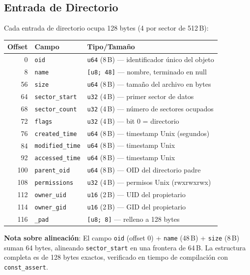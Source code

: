 \documentclass[11pt,twoside,openright]{book}
\theoremstyle{definition}
\theoremstyle{plain}
\theoremstyle{remark}
\begin{document}
\subsection{Entrada de Directorio}

Cada entrada de directorio ocupa 128 bytes (4 por sector de 512\,B):

\begin{center}
\begin{tabular}{@{}rll@{}}
\toprule
\textbf{Offset} & \textbf{Campo} & \textbf{Tipo/Tamaño} \\
\midrule
0   & \texttt{oid}            & \texttt{u64} (8\,B) — identificador único del objeto \\
8   & \texttt{name}           & \texttt{[u8; 48]} — nombre, terminado en null \\
56  & \texttt{size}           & \texttt{u64} (8\,B) — tamaño del archivo en bytes \\
64  & \texttt{sector\_start}  & \texttt{u32} (4\,B) — primer sector de datos \\
68  & \texttt{sector\_count}  & \texttt{u32} (4\,B) — número de sectores ocupados \\
72  & \texttt{flags}          & \texttt{u32} (4\,B) — bit 0 = directorio \\
76  & \texttt{created\_time}  & \texttt{u64} (8\,B) — timestamp Unix (segundos) \\
84  & \texttt{modified\_time} & \texttt{u64} (8\,B) — timestamp Unix \\
92  & \texttt{accessed\_time} & \texttt{u64} (8\,B) — timestamp Unix \\
100 & \texttt{parent\_oid}    & \texttt{u64} (8\,B) — OID del directorio padre \\
108 & \texttt{permissions}    & \texttt{u32} (4\,B) — permisos Unix (rwxrwxrwx) \\
112 & \texttt{owner\_uid}     & \texttt{u16} (2\,B) — UID del propietario \\
114 & \texttt{owner\_gid}     & \texttt{u16} (2\,B) — GID del propietario \\
116 & \texttt{\_pad}          & \texttt{[u8; 8]} — relleno a 128 bytes \\
\bottomrule
\end{tabular}
\end{center}

\textbf{Nota sobre alineación}: El campo \texttt{oid} (offset 0) + \texttt{name} (48\,B)
+ \texttt{size} (8\,B) suman 64 bytes, alineando \texttt{sector\_start} en una
frontera de 64\,B. La estructura completa es de 128 bytes exactos, verificado
en tiempo de compilación con \texttt{const\_assert}.
\end{document}
